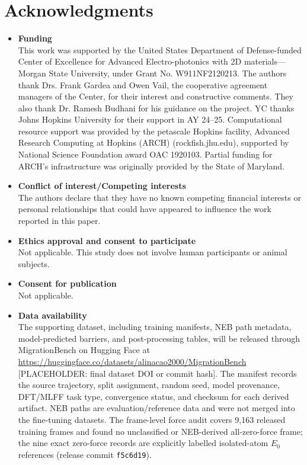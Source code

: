 \documentclass[pdflatex,sn-mathphys-num]{sn-jnl}%
\theoremstyle{thmstyleone}%
\theoremstyle{thmstyletwo}%
\theoremstyle{thmstylethree}%
\begin{document}
\section*{Acknowledgments}

\begin{itemize}
  \item \textbf{Funding} \\
This work was supported by the United States Department of Defense-funded Center of Excellence for Advanced Electro-photonics with 2D materials—Morgan State University, under Grant No. W911NF2120213. The authors thank Drs. Frank Gardea and Owen Vail, the cooperative agreement managers of the Center, for their interest and constructive comments. They also thank Dr. Ramesh Budhani for his guidance on the project.
YC thanks Johns Hopkins University for their support in AY 24–25. Computational resource support was provided by the petascale Hopkins facility, Advanced Research Computing at Hopkins (ARCH) (rockfish.jhu.edu), supported by National Science Foundation award OAC 1920103. Partial funding for ARCH’s infrastructure was originally provided by the State of Maryland.

  \item \textbf{Conflict of interest/Competing interests} \\
  The authors declare that they have no known competing financial interests or personal relationships that could have appeared to influence the work reported in this paper.

  \item \textbf{Ethics approval and consent to participate} \\
  Not applicable. This study does not involve human participants or animal subjects.

  \item \textbf{Consent for publication} \\
  Not applicable.

  \item \textbf{Data availability} \\
  The supporting dataset, including training manifests, NEB path metadata, model-predicted barriers, and post-processing tables, will be released through MigrationBench on Hugging Face at \url{https://huggingface.co/datasets/alinacao2000/MigrationBench} [PLACEHOLDER: final dataset DOI or commit hash]. The manifest records the source trajectory, split assignment, random seed, model provenance, DFT/MLFF task type, convergence status, and checksum for each derived artifact. NEB paths are evaluation/reference data and were not merged into the fine-tuning datasets. The frame-level force audit covers 9,163 released training frames and found no unclassified or NEB-derived all-zero-force frame; the nine exact zero-force records are explicitly labelled isolated-atom $E_0$ references (release commit \texttt{f5c6d19}).


\end{itemize}
\end{document}
